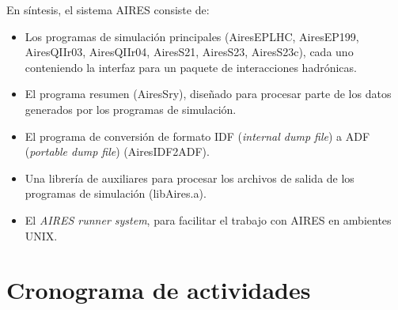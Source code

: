 \documentclass[10pt]{beamer}
\begin{document}
\begin{frame}
En síntesis, el sistema AIRES consiste de:\vspace{0.3 cm}
	\begin{itemize}
	\item Los programas de simulación principales (AiresEPLHC, AiresEP199, AiresQIIr03, AiresQIIr04, AiresS21, AiresS23, AiresS23c), cada uno conteniendo la interfaz para un paquete de interacciones hadrónicas. \vspace{0.3 cm}
	\item El programa resumen (AiresSry), diseñado para procesar parte de los datos generados por los programas de simulación. \vspace{0.3 cm}
	\item El programa de conversión de formato IDF (\textit{internal dump file}) a ADF (\textit{portable dump file}) (AiresIDF2ADF). \vspace{0.3 cm}
	\item Una librería de auxiliares para procesar los archivos de salida de los programas de simulación (libAires.a). \vspace{0.3 cm}
	\item El \textit{AIRES runner system}, para facilitar el trabajo con AIRES en ambientes UNIX. \vspace{0.3 cm}
	\end{itemize}
\end{frame}

\section{Cronograma de actividades}
\end{document}
